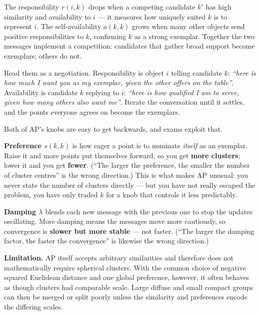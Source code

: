\documentclass[11pt, oneside]{book}
\begin{document}
\begin{intbox}[title={Intuition behind the messages}]
The responsibility $r(i,k)$ drops when a competing candidate $k'$ has high
similarity and availability to $i$ — it measures how uniquely suited $k$ is
to represent $i$.
The self-availability $a(k,k)$ grows when many other objects send positive
responsibilities to $k$, confirming $k$ as a strong exemplar.
Together the two messages implement a competition: candidates that gather
broad support become exemplars; others do not.

Read them as a negotiation.
Responsibility is object $i$ telling candidate $k$: \emph{``here is how much I
want you as my exemplar, given the other offers on the table''}.
Availability is candidate $k$ replying to $i$: \emph{``here is how qualified I am
to serve, given how many others also want me''}.
Iterate the conversation until it settles, and the points everyone agrees on
become the exemplars.
\end{intbox}

\begin{notebox}[title={Exam traps: which way do preference and damping go?}]
Both of AP's knobs are easy to get backwards, and exams exploit that.

\textbf{Preference $s(k,k)$} is how eager a point is to nominate \emph{itself} as
an exemplar.
Raise it and more points put themselves forward, so you get \textbf{more
clusters}; lower it and you get \textbf{fewer}.
(``The larger the preference, the smaller the number of cluster centres'' is the
wrong direction.)
This is what makes AP unusual: you never state the number of clusters directly ---
but you have not really escaped the problem, you have only traded $k$ for a knob
that controls it less predictably.

\textbf{Damping $\lambda$} blends each new message with the previous one to stop
the updates oscillating.
More damping means the messages move more cautiously, so convergence is
\textbf{slower but more stable} --- not faster.
(``The larger the damping factor, the faster the convergence'' is likewise the
wrong direction.)
\end{notebox}

\textbf{Limitation.} AP itself accepts arbitrary similarities and therefore does not
mathematically require spherical clusters. With the common choice of negative squared
Euclidean distance and one global preference, however, it often behaves as though
clusters had comparable scale. Large diffuse and small compact groups can then be merged
or split poorly unless the similarity and preferences encode the differing scales.
\end{document}
